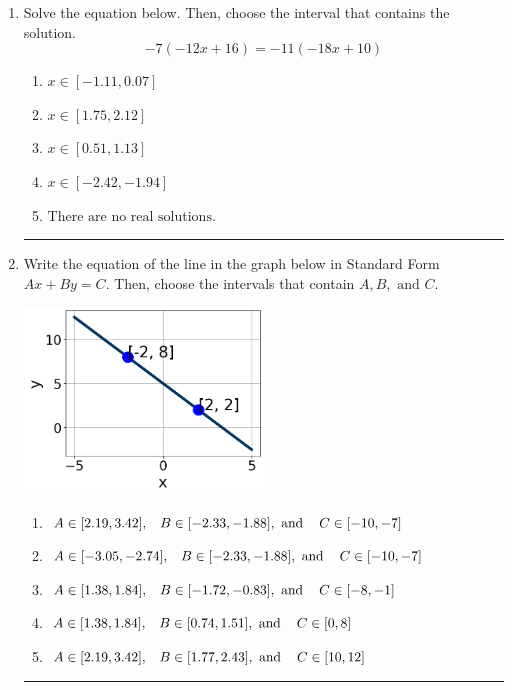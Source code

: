 \documentclass[14pt]{extbook}
\newcommand{\litem}[1]{\item#1\hspace*{-1cm}\rule{\textwidth}{0.4pt}}
\begin{document}
\begin{enumerate}
\litem{
Solve the equation below. Then, choose the interval that contains the solution.\[ -7(-12x + 16) = -11(-18x + 10) \]\begin{enumerate}[label=\Alph*.]
\item \( x \in [-1.11, 0.07] \)
\item \( x \in [1.75, 2.12] \)
\item \( x \in [0.51, 1.13] \)
\item \( x \in [-2.42, -1.94] \)
\item \( \text{There are no real solutions.} \)

\end{enumerate} }
\litem{
Write the equation of the line in the graph below in Standard Form $Ax+By=C$. Then, choose the intervals that contain $A, B, \text{ and } C$.
\begin{center}
    \includegraphics[width=0.5\textwidth]{../Figures/linearGraphToStandardCopyC.png}
\end{center}
\begin{enumerate}[label=\Alph*.]
\item \( A \in [2.19, 3.42], \hspace{3mm} B \in [-2.33, -1.88], \text{ and } \hspace{3mm} C \in [-10, -7] \)
\item \( A \in [-3.05, -2.74], \hspace{3mm} B \in [-2.33, -1.88], \text{ and } \hspace{3mm} C \in [-10, -7] \)
\item \( A \in [1.38, 1.84], \hspace{3mm} B \in [-1.72, -0.83], \text{ and } \hspace{3mm} C \in [-8, -1] \)
\item \( A \in [1.38, 1.84], \hspace{3mm} B \in [0.74, 1.51], \text{ and } \hspace{3mm} C \in [0, 8] \)
\item \( A \in [2.19, 3.42], \hspace{3mm} B \in [1.77, 2.43], \text{ and } \hspace{3mm} C \in [10, 12] \)


\end{enumerate}}
\end{enumerate}
\end{document}
